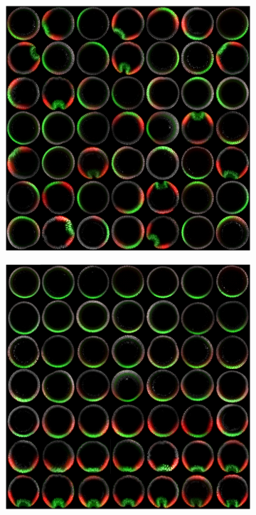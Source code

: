 \documentclass[11pt]{article}
\begin{document}
\begin{figure}
\begin{subfigure}{0.5\textwidth}
\includegraphics[width=\textwidth]{fig2a}
\caption{}
\end{subfigure}
\begin{subfigure}{0.5\textwidth}
\includegraphics[width=\textwidth]{fig2b}
\caption{}
\end{subfigure}
\caption{} 
\label{fig:fluorescent_images}
\end{figure}
\end{document}
